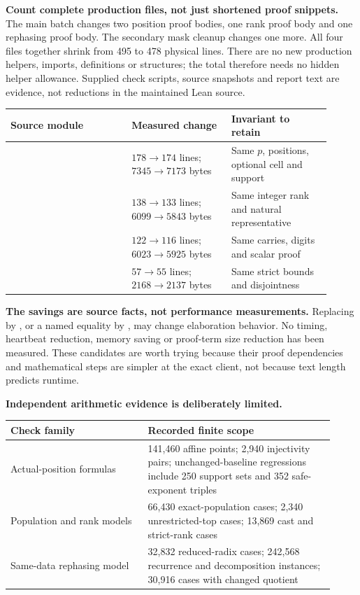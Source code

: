 \textbf{Count complete production files, not just shortened proof snippets.} The main batch changes two position proof bodies, one rank proof body and one rephasing proof body. The secondary mask cleanup changes one more. All four files together shrink from 495 to 478 physical lines. There are no new production helpers, imports, definitions or structures; the total therefore needs no hidden helper allowance. Supplied check scripts, source snapshots and report text are evidence, not reductions in the maintained Lean source.

\begin{tabular}{@{}L{0.34\linewidth}L{0.28\linewidth}L{0.29\linewidth}@{}}\toprule
Source module & Measured change & Invariant to retain\\\midrule
{} & $178\to174$ lines; $7345\to7173$ bytes & Same $p$, positions, optional cell and support\\[6pt]
 & $138\to133$ lines; $6099\to5843$ bytes & Same integer rank and natural representative\\[6pt]
 & $122\to116$ lines; $6023\to5925$ bytes & Same carries, digits and scalar proof\\[6pt]
 & $57\to55$ lines; $2168\to2137$ bytes & Same strict bounds and disjointness\\\bottomrule
\end{tabular}

\textbf{The savings are source facts, not performance measurements.} Replacing  by , or a named equality by , may change elaboration behavior. No timing, heartbeat reduction, memory saving or proof-term size reduction has been measured. These candidates are worth trying because their proof dependencies and mathematical steps are simpler at the exact client, not because text length predicts runtime.

\textbf{Independent arithmetic evidence is deliberately limited.}
\begin{tabular}{@{}L{0.39\linewidth}L{0.53\linewidth}@{}}\toprule
Check family & Recorded finite scope\\\midrule
Actual-position formulas & 141,460 affine points; 2,940 injectivity pairs; unchanged-baseline regressions include 250 support sets and 352 safe-exponent triples\\[6pt]
Population and rank models & 66,430 exact-population cases; 2,340 unrestricted-top cases; 13,869 cast and strict-rank cases\\[6pt]
Same-data rephasing model & 32,832 reduced-radix cases; 242,568 recurrence and decomposition instances; 30,916 cases with changed quotient\\\bottomrule
\end{tabular}

